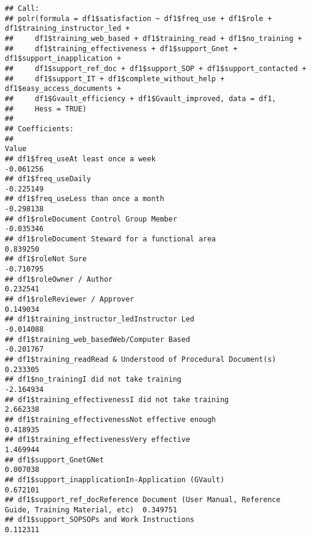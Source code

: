 \documentclass[]{article}
\begin{document}
\begin{verbatim}
## Call:
## polr(formula = df1$satisfaction ~ df1$freq_use + df1$role + df1$training_instructor_led + 
##     df1$training_web_based + df1$training_read + df1$no_training + 
##     df1$training_effectiveness + df1$support_Gnet + df1$support_inapplication + 
##     df1$support_ref_doc + df1$support_SOP + df1$support_contacted + 
##     df1$support_IT + df1$complete_without_help + df1$easy_access_documents + 
##     df1$Gvault_efficiency + df1$Gvault_improved, data = df1, 
##     Hess = TRUE)
## 
## Coefficients:
##                                                                                                  Value
## df1$freq_useAt least once a week                                                             -0.061256
## df1$freq_useDaily                                                                            -0.225149
## df1$freq_useLess than once a month                                                           -0.298138
## df1$roleDocument Control Group Member                                                        -0.035346
## df1$roleDocument Steward for a functional area                                                0.839250
## df1$roleNot Sure                                                                             -0.710795
## df1$roleOwner / Author                                                                        0.232541
## df1$roleReviewer / Approver                                                                   0.149034
## df1$training_instructor_ledInstructor Led                                                    -0.014088
## df1$training_web_basedWeb/Computer Based                                                     -0.201767
## df1$training_readRead & Understood of Procedural Document(s)                                  0.233305
## df1$no_trainingI did not take training                                                       -2.164934
## df1$training_effectivenessI did not take training                                             2.662338
## df1$training_effectivenessNot effective enough                                                0.418935
## df1$training_effectivenessVery effective                                                      1.469944
## df1$support_GnetGNet                                                                          0.007038
## df1$support_inapplicationIn-Application (GVault)                                              0.672101
## df1$support_ref_docReference Document (User Manual, Reference Guide, Training Material, etc)  0.349751
## df1$support_SOPSOPs and Work Instructions                                                     0.112311

\end{verbatim}
\end{document}
